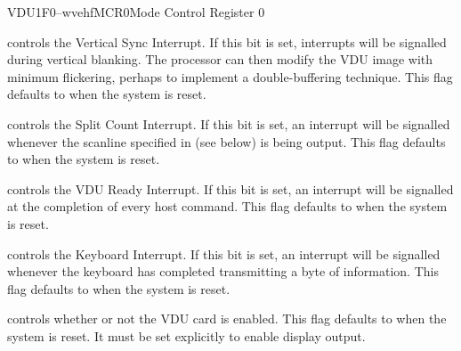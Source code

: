 \begin{ioport}{VDU}{1F0}{--wvehf}{MCR0}{Mode Control Register 0}
\begin{description}
     controls the Vertical Sync Interrupt. If this bit is
    set, interrupts will be signalled during vertical blanking. The processor
    can then modify the VDU image with minimum flickering, perhaps to
    implement a double-buffering technique. This flag defaults to 
    when the system is reset.
    
     controls the Split Count Interrupt. If this bit is
    set, an interrupt will be signalled whenever the scanline specified in
     (see below) is being output. This flag defaults to 
    when the system is reset.

     controls the VDU Ready Interrupt. If this bit is set, an
    interrupt will be signalled at the completion of every host command.  This
    flag defaults to  when the system is reset.

     controls the Keyboard Interrupt. If this bit is set, an
    interrupt will be signalled whenever the keyboard has completed
    transmitting a byte of information. This flag defaults to  when the
    system is reset.

     controls whether or not the VDU card is enabled. This
    flag defaults to  when the system is reset. It must be set
    explicitly to enable display output.

  \end{description}

\end{ioport}



